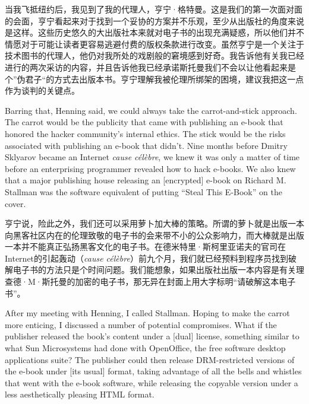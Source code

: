 \ifdefined\chs
当我飞抵纽约后，我见到了我的代理人，亨宁·格特曼。这是我们的第一次面对面的会面，亨宁看起来对于找到一个妥协的方案并不乐观，至少从出版社的角度来说是这样。这些历史悠久的大出版社本来就对电子书的出现充满疑惑，所以他们并不情愿对于可能让读者更容易逃避付费的版权条款进行改变。虽然亨宁是一个关注于技术图书的代理人，他仍对我所处的戏剧般的窘境感到好奇。我告诉他有关我已经进行的两次采访的内容，并且告诉他我已经承诺斯托曼我们不会以让他看起来是个”伪君子“的方式去出版本书。亨宁理解我被伦理所绑架的困境，建议我把这一点作为谈判的关键点。
\fi

\ifdefined\eng
Barring that, Henning said, we could always take the carrot-and-stick approach. The carrot would be the publicity that came with publishing an e-book that honored the hacker community's internal ethics. The stick would be the risks associated with publishing an e-book that didn't. Nine months before Dmitry Sklyarov became an Internet \textit{cause célèbre}, we knew it was only a matter of time before an enterprising programmer revealed how to hack e-books. We also knew that a major publishing house releasing an [encrypted] e-book on Richard M. Stallman was the software equivalent of putting ``Steal This E-Book'' on the cover.
\fi

\ifdefined\chs
亨宁说，险此之外，我们还可以采用萝卜加大棒的策略。所谓的萝卜就是出版一本向黑客社区内在的伦理致敬的电子书的会来带不小的公众影响力，而大棒就是出版一本并不能真正弘扬黑客文化的电子书。在德米特里·斯柯里亚诺夫的官司在Internet的引起轰动（\textit{cause célèbre}）前九个月，我们就已经预料到程序员找到破解电子书的方法只是个时间问题。我们能想象，如果出版社出版一本内容是有关理查德·M·斯托曼的加密的电子书，那无异在封面上用大字标明“请破解这本电子书”。
\fi

\ifdefined\eng
After my meeting with Henning, I called Stallman. Hoping to make the carrot more enticing, I discussed a number of potential compromises. What if the publisher released the book's content under a [dual] license, something similar to what Sun Microsystems had done with OpenOffice, the free software desktop applications suite? The publisher could then release DRM-restricted versions of the e-book under [its usual] format, taking advantage of all the bells and whistles that went with the e-book software, while releasing the copyable version under a less aesthetically pleasing HTML format.
\fi

